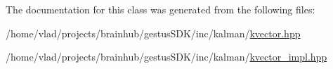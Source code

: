 The documentation for this class was generated from the following files\+:\begin{DoxyCompactItemize}
\item 
/home/vlad/projects/brainhub/gestus\+S\+D\+K/inc/kalman/\mbox{\hyperlink{kvector_8hpp}{kvector.\+hpp}}\item 
/home/vlad/projects/brainhub/gestus\+S\+D\+K/inc/kalman/\mbox{\hyperlink{kvector__impl_8hpp}{kvector\+\_\+impl.\+hpp}}\end{DoxyCompactItemize}

